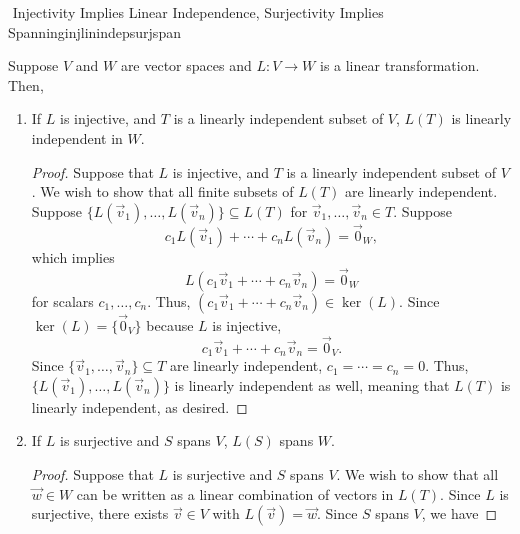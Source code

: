         \begin{theorem}{\Stop\,\,Injectivity Implies Linear Independence, Surjectivity Implies Spanning}{injlinindepsurjspan}

            Suppose \(V\) and \(W\) are vector spaces and \(L:V\to W\) is a linear transformation. Then,
            \begin{enumerate}
                \item If \(L\) is injective, and \(T\) is a linearly independent subset of \(V\), \(L(T)\) is linearly independent in \(W\).
                \begin{proof}
                    Suppose that \(L\) is injective, and \(T\) is a linearly independent subset of \(V\). We wish to show that all finite subsets of \(L(T)\) are linearly independent. Suppose \(\{L(\vec{v}_1),\ldots,L(\vec{v}_n)\}\subseteq L(T)\) for \(\vec{v}_1,\ldots,\vec{v}_n\in T\). Suppose
                    \begin{equation*}
                        c_1L(\vec{v}_1)+\cdots+c_nL(\vec{v}_n)=\vec{0}_W,
                    \end{equation*}
                    which implies 
                    \begin{equation*}
                        L(c_1\vec{v}_1+\cdots+c_n\vec{v}_n)=\vec{0}_W
                    \end{equation*}
                    for scalars \(c_1,\ldots,c_n\). Thus, \((c_1\vec{v}_1+\cdots+c_n\vec{v}_n)\in\ker(L)\). Since \(\ker(L)=\{\vec{0}_V\}\) because \(L\) is injective,
                    \begin{equation*}
                        c_1\vec{v}_1+\cdots+c_n\vec{v}_n=\vec{0}_V.
                    \end{equation*}
                    Since \(\{\vec{v}_1,\ldots,\vec{v}_n\}\subseteq T\) are linearly independent, \(c_1=\cdots=c_n=0\). Thus, \(\{L(\vec{v}_1),\ldots,L(\vec{v}_n)\}\) is linearly independent as well, meaning that \(L(T)\) is linearly independent, as desired.
                \end{proof}
                \item If \(L\) is surjective and \(S\) spans \(V\), \(L(S)\) spans \(W\).
                \begin{proof}
                    Suppose that \(L\) is surjective and \(S\) spans \(V\). We wish to show that all \(\vec{w}\in W\) can be written as a linear combination of vectors in \(L(T)\). Since \(L\) is surjective, there exists \(\vec{v}\in V\) with \(L(\vec{v})=\vec{w}\). Since \(S\) spans \(V\), we have

\end{proof}
\end{enumerate}
\end{theorem}

